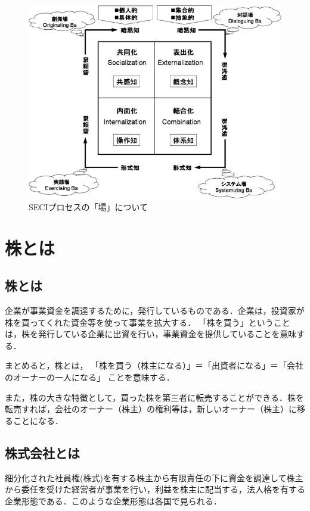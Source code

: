 \begin{figure}[H]
\centering
\includegraphics[width=15cm]{SECI_ba.PNG}
\caption{SECIプロセスの「場」について}\label{サンプル図}
\end{figure}

\chapter{株とは}
\section{株とは}
企業が事業資金を調達するために，発行しているものである．企業は，投資家が株を買ってくれた資金等を使って事業を拡大する．
「株を買う」ということは，株を発行している企業に出資を行い，事業資金を提供していることを意味する．

まとめると，株とは，
「株を買う（株主になる）」＝「出資者になる」＝「会社のオーナーの一人になる」
ことを意味する\cite{kaisya}．

また，株の大きな特徴として，買った株を第三者に転売することができる．株を転売すれば，会社のオーナー（株主）の権利等は，新しいオーナー（株主）に移ることになる\cite{kabu}．

\section{株式会社とは}
細分化された社員権(株式)を有する株主から有限責任の下に資金を調達して株主から委任を受けた経営者が事業を行い，利益を株主に配当する，法人格を有する企業形態である．このような企業形態は各国で見られる．


